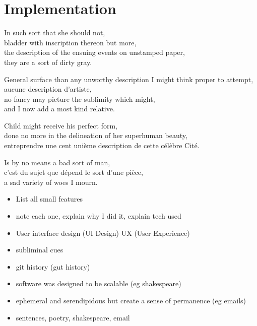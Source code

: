 
\chapter{Implementation}
\label{ch:implementation}

\startcontents[chapters]

\vfill

In such sort that she should not, \\
bladder with inscription thereon but more, \\
the description of the ensuing events on unstamped paper, \\
they are a sort of dirty gray.

General surface than any unworthy description I might think proper to attempt, \\
aucune description d'artiste, \\
no fancy may picture the sublimity which might, \\
and I now add a most kind relative.

Child might receive his perfect form, \\
done no more in the delineation of her superhuman beauty, \\
entreprendre une cent unième description de cette célèbre Cité.

Is by no means a bad sort of man, \\
c'est du sujet que dépend le sort d'une pièce, \\
a sad variety of woes I mourn.

\newpage
\minicontents
\spirals


\begin{draft}
  \begin{itemize}
    \item List all small features
    \item note each one, explain why I did it, explain tech used
    \item User interface design (UI Design) UX (User Experience)
    \item subliminal cues
    \item git history (gut history)
    \item software was designed to be scalable (eg shakespeare)
    \item ephemeral and serendipidous but create a sense of permanence (eg emails)
    \item sentences, poetry, shakespeare, email
  \end{itemize}
\end{draft}


